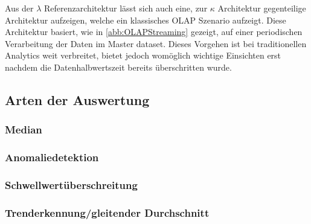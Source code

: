 Aus der $\lambda$ Referenzarchitektur lässt sich auch eine, zur $\kappa$ Architektur gegenteilige Architektur aufzeigen, welche ein klassisches \ac{OLAP} Szenario aufzeigt.  Diese Architektur basiert, wie in \autoref{abb:OLAPStreaming} gezeigt, auf einer periodischen Verarbeitung der Daten im Master dataset. Dieses Vorgehen ist bei traditionellen Analytics weit verbreitet, bietet jedoch womöglich wichtige Einsichten erst nachdem die Datenhalbwertszeit bereits überschritten wurde.


\subsection{Arten der Auswertung}
\subsubsection{Median}
\subsubsection{Anomaliedetektion}
\subsubsection{Schwellwertüberschreitung}
\subsubsection{Trenderkennung/gleitender Durchschnitt}


